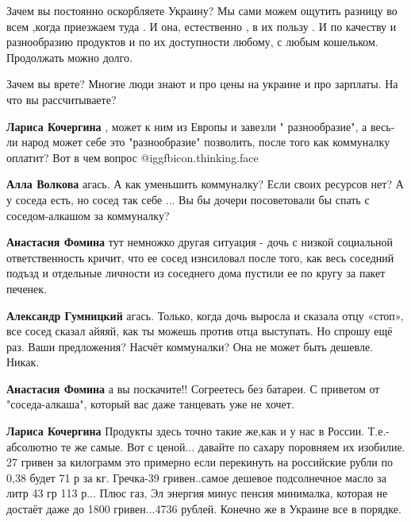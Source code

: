 \begin{itemize}

Зачем вы постоянно оскорбляете Украину? Мы сами можем ощутить разницу во всем
,когда приезжаем туда . И она, естественно , в их пользу . И по качеству и
разнообразию продуктов и по их доступности любому, с любым кошельком.
Продолжать можно долго.

\begin{itemize} %
Зачем вы врете? Многие люди знают и про цены на украине и про зарплаты. На что вы рассчитываете?

\textbf{Лариса Кочергина} , может к ним из Европы и завезли " разнообразие", а весь- ли народ может себе это "разнообразие" позволить, после того как коммуналку оплатит? Вот в чем вопрос @igg{fbicon.thinking.face} 

\textbf{Алла Волкова} агась. А как уменьшить коммуналку? Если своих ресурсов нет? А у соседа есть, но сосед так себе ... Вы бы дочери посоветовали бы спать с соседом-алкашом за коммуналку?

\textbf{Анастасия Фомина} тут немножко другая ситуация - дочь с низкой социальной ответственность кричит, что ее сосед изнсиловал после того, как весь соседний подъзд и отдельные личности из соседнего дома пустили ее по кругу за пакет печенек.

\textbf{Александр Гумницкий} агась. Только, когда дочь выросла и сказала отцу «стоп», все сосед сказал айяяй, как ты можешь против отца выступать. Но спрошу ещё раз. Ваши предложения? Насчёт коммуналки? Она не может быть дешевле. Никак.

\textbf{Анастасия Фомина} а вы поскачите!! Согреетесь без батареи. С приветом от "соседа-алкаша", который вас даже танцевать уже не хочет.

\textbf{Лариса Кочергина} Продукты здесь точно такие же,как и у нас в России. Т.е.- абсолютно те же самые. Вот с ценой... давайте по сахару поровняем их изобилие. 27 гривен за килограмм это примерно если перекинуть на российские рубли по 0,38 будет 71 р за кг. Гречка-39 гривен..самое дешевое подсолнечное масло за литр 43 гр 113 р... Плюс газ, Эл энергия минус пенсия минималка, которая не достаёт даже до 1800 гривен...4736 рублей. Конечно же в Украине все в порядке.



\end{itemize}
\end{itemize}
